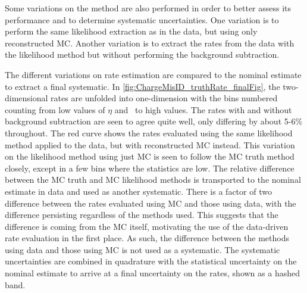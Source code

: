 Some variations on the method are also performed
in order to better assess its performance 
and to determine systematic uncertainties.
One variation is to perform the same likelihood extraction
as in the data, but using only reconstructed MC. 
Another variation is to extract the rates from the data with the 
likelihood method but without performing the background
subtraction. 


The different variations on  rate estimation are compared to the 
nominal estimate to extract
a final systematic. In \fig\ref{fig:ChargeMisID_truthRate_finalFig},
the two-dimensional rates are unfolded into one-dimension
with the bins numbered counting from low values of $\eta$ and \pt~to
high values. The rates with and without background
subtraction are seen to agree quite well, only 
differing by about 5-6\% throughout.  
The red curve shows the rates evaluated using the same likelihood method
applied to the data, but with reconstructed MC instead. 
This variation on the likelihood method using just MC
is seen to follow the MC truth method closely, except in a few bins where the statistics
are low. The relative difference between the MC truth and MC likelihood methods
is transported to the nominal estimate in data and used as another systematic.
There is a factor of two difference between the rates evaluated using MC
and those using data, with the difference persisting regardless of the methods used. 
This suggests that the difference is coming from the MC itself, motivating the
use of the data-driven rate evaluation in the first place. 
As such, the difference between the methods using data and those using MC is not
used as a systematic.
The systematic uncertainties are combined in quadrature with the statistical
uncertainty on the nominal estimate to arrive at a final uncertainty on the
rates, shown as a hashed band.


